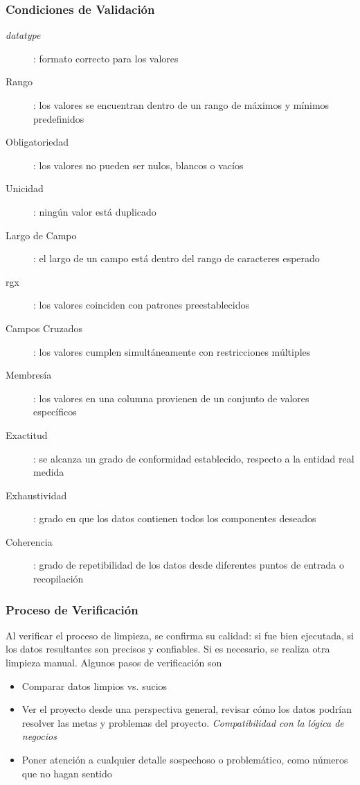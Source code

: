 \subsubsection{Condiciones de Validación}
\begin{description}
    \item [\textit{datatype}]{: formato correcto para los valores}
    \item [Rango]{: los valores se encuentran dentro de un rango de máximos y mínimos predefinidos}
    \item [Obligatoriedad]{: los valores no pueden ser nulos, blancos o vacíos}
    \item [Unicidad]{: ningún valor está duplicado}
    \item [Largo de Campo]{: el largo de un campo está dentro del rango de caracteres esperado}
    \item [\gls{rgx}]{: los valores coinciden con patrones preestablecidos}
    \item [Campos Cruzados]{: los valores cumplen simultáneamente con restricciones múltiples}
    \item [Membresía]{: los valores en una columna provienen de un conjunto de valores específicos} 
    \item [Exactitud]{: se alcanza un grado de conformidad establecido, respecto a la entidad real medida}
    \item [Exhaustividad]{: grado en que los datos contienen todos los componentes deseados}
    \item [Coherencia]{: grado de repetibilidad de los datos desde diferentes puntos de entrada o recopilación}
\end{description}

\subsubsection{Proceso de Verificación}
Al verificar el proceso de limpieza, se confirma su calidad: si fue bien ejecutada, si los datos resultantes son precisos y confiables. Si es necesario, se realiza otra limpieza manual. Algunos pasos de verificación son
\begin{itemize}
    \item {Comparar datos limpios vs. sucios}
    \item {Ver el proyecto desde una perspectiva general, revisar cómo los datos podrían resolver las metas y problemas del proyecto. \textit{Compatibilidad con la lógica de negocios}}
    \item {Poner atención a cualquier detalle sospechoso o problemático, como números que no hagan sentido}
\end{itemize}


